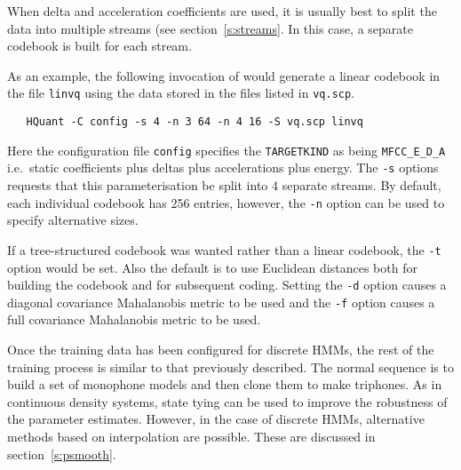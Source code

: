 When delta and acceleration coefficients are used, it is usually best
to split the data into multiple streams (see section~\ref{s:streams}.
In this case, a separate codebook is built for each stream.

As an example, the following invocation of  would
generate a linear codebook in the file \texttt{linvq} using
the data stored in the files listed in \texttt{vq.scp}.  
\begin{verbatim}
   HQuant -C config -s 4 -n 3 64 -n 4 16 -S vq.scp linvq
\end{verbatim}
Here the configuration file \texttt{config} specifies the \texttt{TARGETKIND}
as being \texttt{MFCC\_E\_D\_A} i.e.\ static coefficients plus deltas plus
accelerations plus energy.  The \texttt{-s} options requests that this
parameterisation be split into
4 separate streams.  By default, each individual codebook has 256 entries, however,
the \texttt{-n} option can be used to specify alternative sizes.

If a tree-structured codebook was wanted rather than a linear codebook,
the \texttt{-t} option would be set.
Also the default is to use Euclidean distances both for building the
codebook and for subsequent coding.  Setting the \texttt{-d} option
causes a diagonal covariance Mahalanobis metric to be used and 
the \texttt{-f} option causes a full covariance Mahalanobis metric
to be used.


Once the training data has been configured for discrete HMMs, the 
rest of the training process is similar to that previously described.
The normal sequence is to build a set of monophone models and then
clone them to make triphones.  As in continuous density systems, 
state tying can be used to improve the
robustness of the parameter estimates.  However, in the case of discrete HMMs,
alternative methods based on interpolation are possible.  These are discussed
in section~\ref{s:psmooth}.

